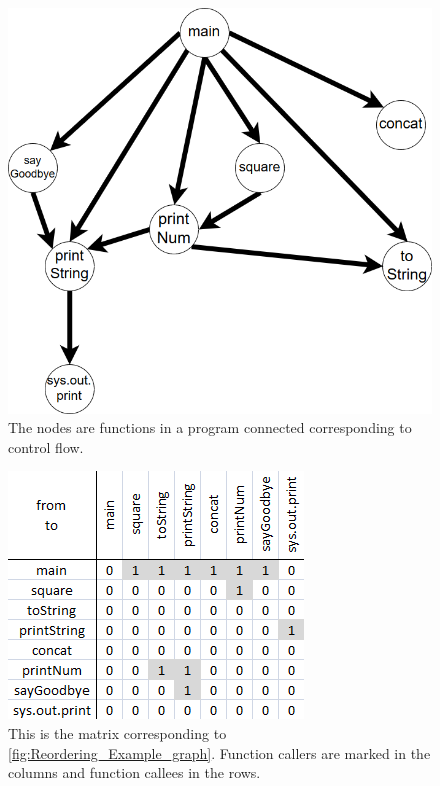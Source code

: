 \begin{figure}[tp]
  \centering
  \includegraphics[keepaspectratio,width=\hsize,height=\halfh]
  {images/Reordering_Example_graph.png}

  \caption[Directed Graph of Sample Data]{
  The nodes are functions in a program connected corresponding to control flow.
  }
  \label{fig:reordering_example_graph}
\end{figure}

\begin{figure}[tp]
  \centering
  \includegraphics[scale=0.9]
  {images/Reordering_Example_matrix.png}
  
  \caption[Matrix Representation of Sample Data]{
  This is the matrix corresponding to \ref{fig:Reordering_Example_graph}. Function callers are marked in the columns and function callees in the rows.
  }
  \label{fig:reordering_example_matrix}
\end{figure}

